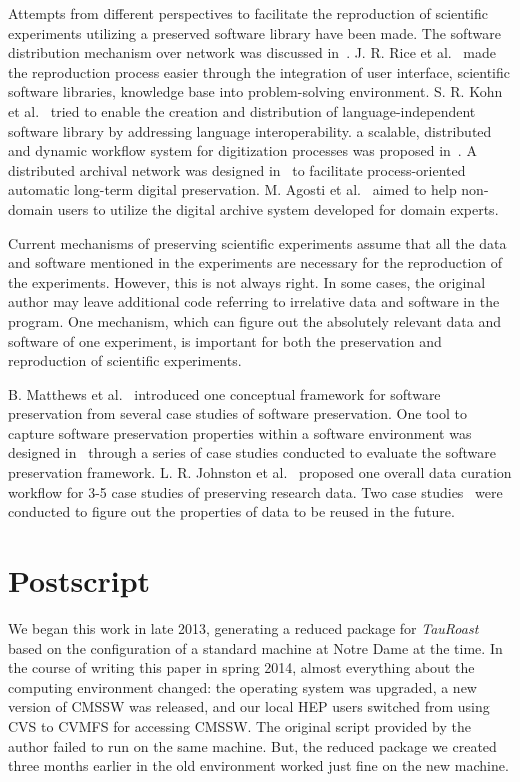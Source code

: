 \documentclass{sig-alternate}
\begin{document}
Attempts from different perspectives to facilitate the reproduction of scientific experiments utilizing a preserved software library have been made. 
The software distribution mechanism over network was discussed in~\cite{compostella2010cdf, blomer2011cernvm}.
J. R. Rice et al.~\cite{rice1996scientific} made the reproduction process easier through the integration of user interface, scientific software libraries, knowledge base into problem-solving environment.
S. R. Kohn et al.~\cite{kohn2001divorcing} tried to enable the creation and distribution of language-independent software library by addressing language interoperability.
a scalable, distributed and dynamic workflow system for digitization processes was proposed in~\cite{schoneberg2013scalable}.
A distributed archival network was designed in~\cite{subotic2013distributed} to facilitate process-oriented automatic long-term digital preservation.
M. Agosti et al.~\cite{agosti2012envisage} aimed to help non-domain users to utilize the digital archive system developed for domain experts.

Current mechanisms of preserving scientific experiments assume that all the data and software mentioned in the experiments are necessary for the reproduction of the experiments. However, this is not always right. In some cases, the original author may leave additional code referring to irrelative data and software in the program. One mechanism, which can figure out the absolutely relevant data and software of one experiment, is important for both the preservation and reproduction of scientific experiments.

B. Matthews et al.~\cite{matthews2008significant} introduced one conceptual framework for software preservation from several case studies of software preservation.
One tool to capture software preservation properties within a software environment was designed in~\cite{matthews2010framework} through a series of case studies conducted to evaluate the software preservation framework.
L. R. Johnston et al.~\cite{johnston2014workflow} proposed one overall data curation workflow for 3-5 case studies of preserving research data.
Two case studies~\cite{borgman2012data} were conducted to figure out the properties of data to be reused in the future.

\section{Postscript}

We began this work in late 2013, generating a reduced package for \emph{TauRoast} based
on the configuration of a standard machine at Notre Dame at the time.  In the course
of writing this paper in spring 2014, almost everything about the computing environment
changed: the operating system was upgraded, a new version of CMSSW was released, and
our local HEP users switched from using CVS to CVMFS for accessing CMSSW.
The original script provided by the author failed to run on the same machine.
But, the reduced package we created three months earlier in the old environment
worked just fine on the new machine.
\end{document}
